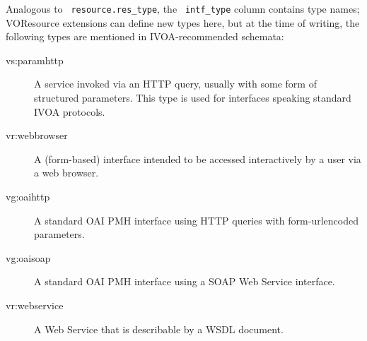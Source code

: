 \documentclass[11pt,a4paper]{ivoa}
\newcommand{\rtent}[1]{\texttt{\color{rtcolor} #1}}
\begin{document}
Analogous to \rtent{resource.res\_type}, the
\rtent{intf\_type} column contains type names; VOResource extensions
can define new types here, but at the time of writing, the following
types are mentioned in IVOA-recommended schemata:


\begin{description}
\item[vs:paramhttp]A service invoked via an HTTP query, usually with some form of
structured parameters. This type is used for interfaces speaking
standard IVOA protocols.
\item[vr:webbrowser]A (form-based) interface intended to be accessed interactively by a
user via a web browser.
\item[vg:oaihttp]A standard OAI PMH interface using HTTP queries with form-urlencoded
parameters.
\item[vg:oaisoap]A standard OAI PMH interface using a SOAP Web Service
interface.
\item[vr:webservice]A Web Service that is describable by a WSDL document.

\end{description}


\end{document}

